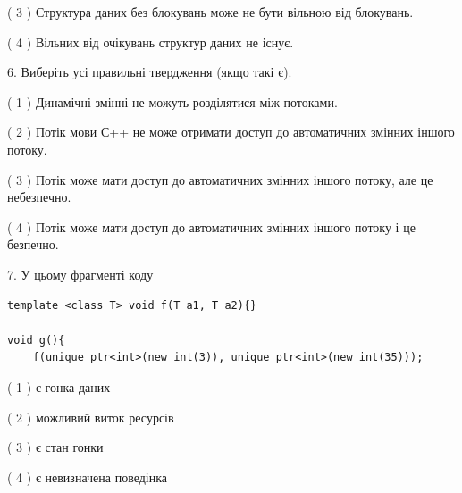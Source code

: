\documentclass[12pt, ukrainian]{article}
\begin{document}
\begin {large}
{( 3 ) Структура даних без блокувань може не бути вільною від блокувань.%

( 4 ) Вільних від очікувань структур даних не існує.%
\newpage



\vspace{5mm}
6. Виберіть усі правильні твердження (якщо такі є).\par
\vspace{2mm}

( 1 ) Динамічні змінні не можуть розділятися між потоками.%

( 2 ) Потік мови С++ не може отримати доступ до автоматичних змінних іншого потоку.%

( 3 ) Потік може мати доступ до автоматичних змінних іншого потоку, але це небезпечно.%

( 4 ) Потік може мати доступ до автоматичних змінних іншого потоку і це безпечно.%


\vspace{5mm}
7. У цьому фрагменті коду
\begin{verbatim}
template <class T> void f(T a1, T a2){}

void g(){
    f(unique_ptr<int>(new int(3)), unique_ptr<int>(new int(35)));
\end{verbatim}

( 1 ) є гонка даних%

( 2 ) можливий виток ресурсів%

( 3 ) є стан гонки%

( 4 ) є невизначена поведінка%
}
\end {large}
\end{document}
